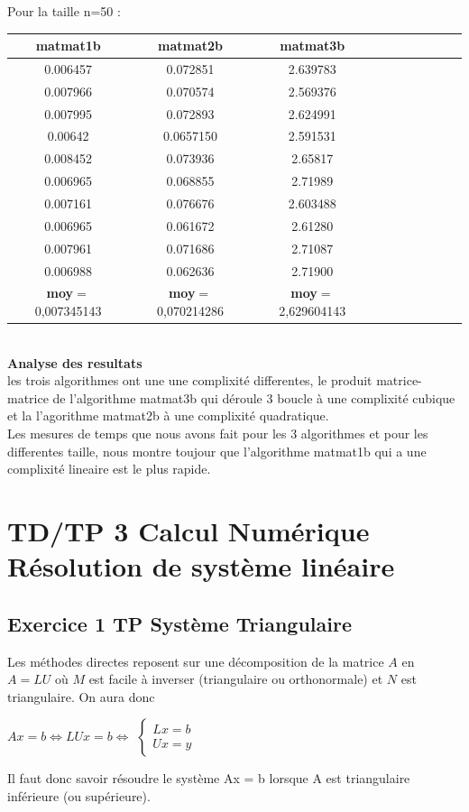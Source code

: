 \documentclass[12pt]{report}
\begin{document}
Pour la taille n=50 :\\


\begin{tabular}{|*{10}{c|}}
	\hline
	\textbf{matmat1b}  & \textbf{matmat2b}  & \textbf{matmat3b}\\
	\hline
	0.006457  & 0.072851  & 2.639783   \\
	\hline
	0.007966  & 0.070574  & 2.569376   \\
	\hline
	0.007995  & 0.072893  & 2.624991   \\
	\hline
	0.00642  & 0.0657150  & 2.591531   \\
	\hline
	0.008452  & 0.073936  & 2.65817  \\
	\hline
	0.006965  & 0.068855  & 2.71989   \\
	\hline
	0.007161  & 0.076676  & 2.603488   \\
	\hline
	0.006965  & 0.061672  & 2.61280   \\
	\hline
	0.007961  & 0.071686  & 2.71087   \\
	\hline
	0.006988  & 0.062636  & 2.71900   \\
	\hline
	\textbf{moy}$=$ 0,007345143  & \textbf{moy}$=$ 0,070214286  & \textbf{moy}$=$ 2,629604143   \\
	\hline
	
\end{tabular}\\

\textbf{Analyse des resultats}\\

les trois algorithmes ont une une complixité differentes, le produit matrice-matrice de l'algorithme matmat3b qui déroule 3 boucle à une complixité cubique et la l'agorithme matmat2b à une complixité quadratique.\\

Les mesures de temps que nous avons fait pour les 3 algorithmes et pour les differentes taille, nous montre toujour que l'algorithme matmat1b qui a une complixité lineaire est le plus rapide. 
 
\chapter{TD/TP 3 Calcul Numérique Résolution de système linéaire}
\section{Exercice 1 TP Système Triangulaire}

Les méthodes directes reposent sur une décomposition de la matrice $A$ en $A = LU$ où $M$ est facile à inverser (triangulaire ou orthonormale) et $N$ est triangulaire. On aura donc
\begin{center}
$Ax = b \Leftrightarrow LUx = b \Leftrightarrow $ $\left\{\begin{array}{l} Lx=b \\ Ux=y\end{array}\right.$
\end{center}
Il faut donc savoir résoudre le système Ax = b lorsque A est triangulaire inférieure (ou supérieure).
\end{document}
